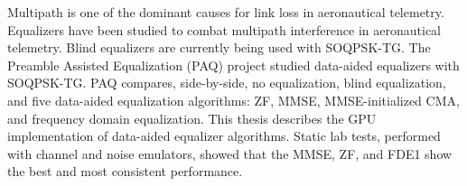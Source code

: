 \afterpage{\cleardoublepage}
Multipath is one of the dominant causes for link loss in aeronautical telemetry.
Equalizers have been studied to combat multipath interference in aeronautical telemetry.
Blind equalizers are currently being used with SOQPSK-TG.
The Preamble Assisted Equalization (PAQ) project studied data-aided equalizers with SOQPSK-TG.
PAQ compares, side-by-side, no equalization, blind equalization, and five data-aided equalization algorithms: ZF, MMSE, MMSE-initialized CMA, and frequency domain equalization.
This thesis describes the GPU implementation of data-aided equalizer algorithms.
Static lab tests, performed with channel and noise emulators, showed that the MMSE, ZF, and FDE1 show the best and most consistent performance.
